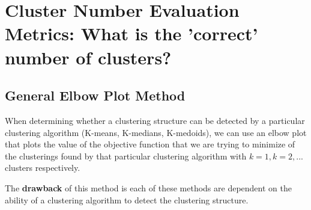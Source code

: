 \documentclass[11pt]{elegantbook}
\begin{document}
\section{Cluster Number Evaluation Metrics: What is the 'correct' number of clusters?}

\subsection{General Elbow Plot Method}
\begin{definition}
    When determining whether a clustering structure can be detected by a particular clustering algorithm (K-means, K-medians, K-medoids), we can use an elbow plot that plots the value of the objective function that we are trying to minimize of the clusterings found by that particular clustering algorithm with $k=1,k=2,...$ clusters respectively.
\end{definition}

The \textbf{drawback} of this method is each of these methods are dependent on the ability of a clustering algorithm to detect the clustering structure.
\end{document}

